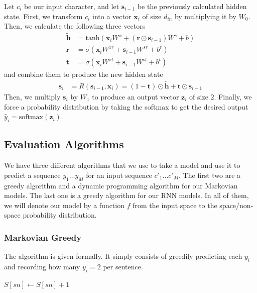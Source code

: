 \documentclass[11pt]{article}
\begin{document}
Let $c_i$ be our input character, and let $\mathbf{s}_{i-1}$ be the previously calculated hidden state. First, we transform $c_i$ into a vector $\mathbf{x}_i$ of size $d_{in}$ by multiplying it by $W_0$. Then, we calculate the following three vectors
\begin{align*}
  \widetilde{\mathbf{h}} &= \text{tanh}(\mathbf{x}_iW^{x} + (\mathbf{r} \odot \mathbf{s}_{i-1})W^s + b) \\
  \mathbf{r} &= \sigma(\mathbf{x}_iW^{xr} + \mathbf{s}_{i-1}W^{sr} + b^r) \\
  \mathbf{t} &= \sigma(\mathbf{x}_iW^{xt} + \mathbf{s}_{i-1}W^{st} + b^t)
\end{align*}
and combine them to produce the new hidden state
\begin{align*}
  \mathbf{s}_i &= R(\mathbf{s}_{i-1}, \mathbf{x}_i) = (1 - \mathbf{t}) \odot \widetilde{\mathbf{h}} + \mathbf{t} \odot \mathbf{s}_{i-1}
\end{align*}
Then, we multiply $\mathbf{s}_i$ by $W_1$ to produce an output vector $\mathbf{z}_i$ of size $2$. Finally, we force a probability distribution by taking the softmax to get the desired output $\hat{y}_i = \text{softmax}(\mathbf{z}_i)$. 
\subsection{Evaluation Algorithms}

We have three different algorithms that we use to take a model and use it to predict a sequence $y_1\dots y_M$ for an input sequence $c'_1\dots c'_M$. The first two are a greedy algorithm and a dynamic programming algorithm for our Markovian models. The last one is a greedy algorithm for our RNN models. In all of them, we will denote our model by a function $f$ from the input space to the space/non-space probability distribution. 

\subsubsection{Markovian Greedy}

The algorithm is given formally. It simply consists of greedily predicting each $y_i$ and recording how many $y_i = 2$ per sentence. 

\begin{algorithmic}
      \EndIf{}
        $S[sn] \leftarrow S[sn] + 1$
      \EndIf{}
    \EndFor{}
  \EndProcedure{}
\end{algorithmic}
\end{document}
